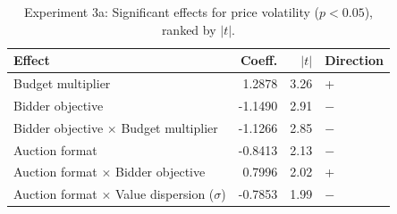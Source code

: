 \begin{table}[H]
\centering
\caption{Experiment 3a: Significant effects for price volatility ($p < 0.05$), ranked by $|t|$.}
\label{tab:exp3a_ranked_vol}
\begin{tabular}{lrrl}
\toprule
\textbf{Effect} & \textbf{Coeff.} & \textbf{$|t|$} & \textbf{Direction} \\
\midrule
Budget multiplier & 1.2878 & 3.26 & + \\
Bidder objective & -1.1490 & 2.91 & $-$ \\
Bidder objective $\times$ Budget multiplier & -1.1266 & 2.85 & $-$ \\
Auction format & -0.8413 & 2.13 & $-$ \\
Auction format $\times$ Bidder objective & 0.7996 & 2.02 & + \\
Auction format $\times$ Value dispersion ($\sigma$) & -0.7853 & 1.99 & $-$ \\
\bottomrule
\end{tabular}
\end{table}
